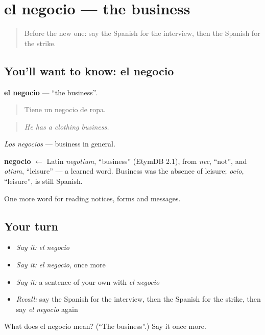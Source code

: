 \section[el negocio]{el negocio — the business}

\label{lesson:ES-C490-negocio}



\begin{quote}
Before the new one: say the Spanish for the interview, then the Spanish for the strike.
\end{quote}

\subsection*{You'll want to know: el negocio}
\textbf{el negocio} — \textquotedblleft{}the business\textquotedblright{}.

\begin{quote}
Tiene un negocio de ropa.
\end{quote}

\begin{quote}
\emph{He has a clothing business.}
\end{quote}

\emph{Los negocios} — business in general.

\begin{cousinweb}
\textbf{negocio} $\leftarrow$ Latin \emph{negotium}, \textquotedblleft{}business\textquotedblright{} (EtymDB 2.1), from \emph{nec}, \textquotedblleft{}not\textquotedblright{}, and \emph{otium}, \textquotedblleft{}leisure\textquotedblright{} — a learned word. Business was the absence of leisure; \emph{ocio}, \textquotedblleft{}leisure\textquotedblright{}, is still Spanish.
\end{cousinweb}

\begin{grammarlens}[title={What you've built}]
One more word for reading notices, forms and messages.
\end{grammarlens}

\subsection*{Your turn}
\begin{itemize}
\raggedright
  \item \emph{Say it:} \emph{el negocio}
  \item \emph{Say it:} \emph{el negocio}, once more
  \item \emph{Say it:} a sentence of your own with \emph{el negocio}
  \item \emph{Recall:} say the Spanish for the interview, then the Spanish for the strike, then say \emph{el negocio} again
\end{itemize}

\begin{tcolorbox}[breakable,colback=teal!4,colframe=teal!35!black,title={Before you move on}]
What does el negocio mean? (\textquotedblleft{}The business\textquotedblright{}.) Say it once more.
\end{tcolorbox}
